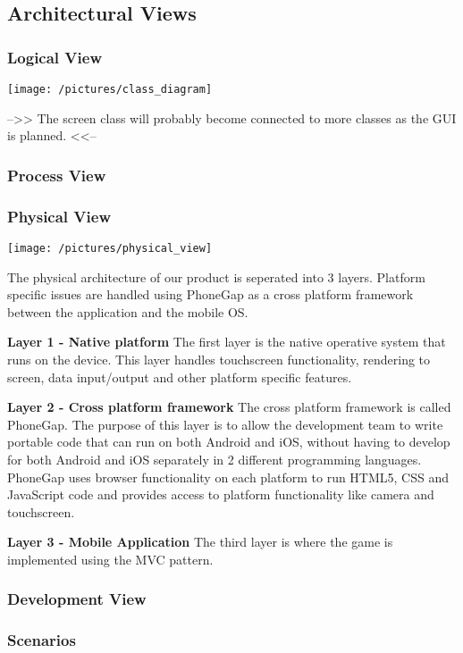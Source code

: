 \subsection{Architectural Views}

\subsubsection{Logical View} %
\texttt{[image: /pictures/class\_diagram]}

-->> The screen class will probably become connected to more classes as the GUI is planned. <<--

\subsubsection{Process View} %

\subsubsection{Physical View} %
\texttt{[image: /pictures/physical\_view]}

The physical architecture of our product is seperated into 3 layers. Platform specific issues are handled using PhoneGap as a cross platform framework between the application and the mobile OS.

{\bf Layer 1 - Native platform}
The first layer is the native operative system that runs on the device. This layer handles touchscreen functionality, rendering to screen, data input/output and other platform specific features.

{\bf Layer 2 - Cross platform framework}
The cross platform framework is called PhoneGap. The purpose of this layer is to allow the development team to write portable code that can run on both Android and iOS, without having to develop for both Android and iOS separately in 2 different programming languages. PhoneGap uses browser functionality on each platform to run HTML5, CSS and JavaScript code and provides access to platform functionality like camera and touchscreen.

{\bf Layer 3 - Mobile Application}
The third layer is where the game is implemented using the MVC pattern. 


\subsubsection{Development View} %

\subsubsection{Scenarios} %
